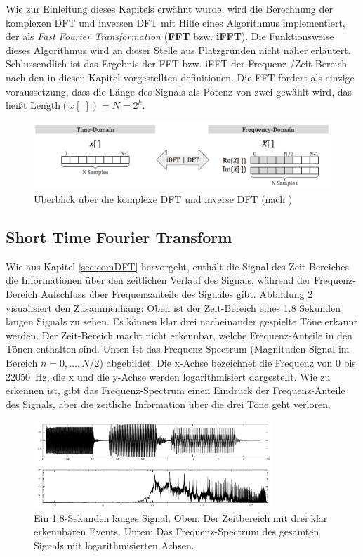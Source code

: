  
Wie zur Einleitung dieses Kapitels erwähnt wurde, wird die Berechnung der komplexen DFT und inversen DFT mit Hilfe eines Algorithmus implementiert, der als \emph{Fast Fourier Transformation} (\textbf{FFT} bzw. \textbf{iFFT}). Die Funktionsweise dieses Algorithmus wird an dieser Stelle aus Platzgründen nicht näher erläutert. Schlussendlich ist das Ergebnis der FFT bzw. iFFT der Frequenz-/Zeit-Bereich nach den in diesen Kapitel vorgestellten definitionen. Die FFT fordert als einzige voraussetzung, dass die Länge des Signals als Potenz von zwei gewählt wird, das heißt Length$(x[\;]) = N = 2^k$. \cite[S. 225 - 226]{dspGuide}

\begin{figure}[h]
	\centering
	\includegraphics[width=1\textwidth]{bilder/compDFTOverview02.png}
	\caption{Überblick über die komplexe DFT und inverse DFT (nach \cite[S. 226]{dspGuide})}
	\label{img:complexDFTOverview}
\end{figure}

\subsection{Short Time Fourier Transform}
\label{sec:stft}

Wie aus Kapitel \ref{sec:comDFT} hervorgeht, enthält die Signal des Zeit-Bereiches die Informationen über den zeitlichen Verlauf des Signals, während der Frequenz-Bereich Aufschluss über Frequenzanteile des Signales gibt. Abbildung \ref{img:stft01} visualisiert den Zusammenhang: Oben ist der Zeit-Bereich eines 1.8 Sekunden langen Signals zu sehen. Es können klar drei nacheinander gespielte Töne erkannt werden. Der Zeit-Bereich macht nicht erkennbar, welche Frequenz-Anteile in den Tönen enthalten sind. Unten ist das Frequenz-Spectrum (Magnituden-Signal im Bereich  $n = 0 ,\ldots, N/2$) abgebildet. Die x-Achse bezeichnet die Frequenz von 0 bis \SI{22050}{\hertz}, die x und die y-Achse werden logarithmisiert dargestellt. Wie zu erkennen ist, gibt das Frequenz-Spectrum einen Eindruck der Frequenz-Anteile des Signals, aber die zeitliche Information über die drei Töne geht verloren.

 \begin{figure}[h]
	\centering
	\includegraphics[width=0.8\textwidth]{bilder/stft01.png}
	\caption{Ein 1.8-Sekunden langes Signal. Oben: Der Zeitbereich mit drei klar erkennbaren Events. Unten: Das Frequenz-Spectrum des gesamten Signals mit logarithmisierten Achsen.}
	\label{img:stft01}
\end{figure}

